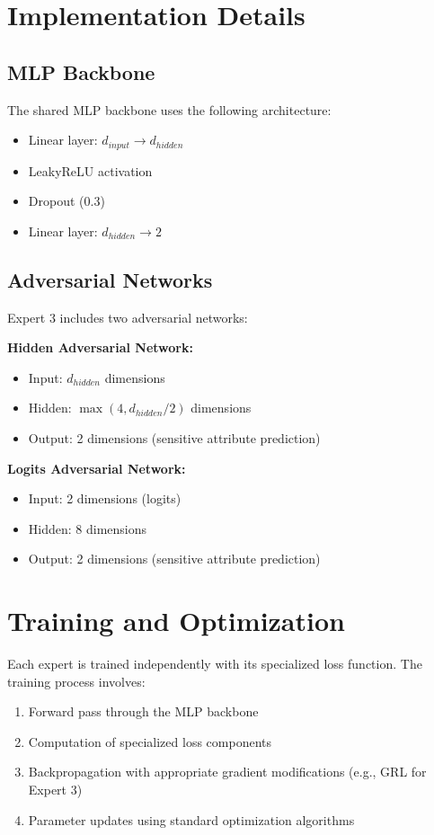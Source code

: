 \documentclass[11pt]{article}
\begin{document}
\section{Implementation Details}

\subsection{MLP Backbone}
The shared MLP backbone uses the following architecture:
\begin{itemize}
    \item Linear layer: $d_{input} \rightarrow d_{hidden}$
    \item LeakyReLU activation
    \item Dropout (0.3)
    \item Linear layer: $d_{hidden} \rightarrow 2$
\end{itemize}

\subsection{Adversarial Networks}
Expert 3 includes two adversarial networks:

\textbf{Hidden Adversarial Network:}
\begin{itemize}
    \item Input: $d_{hidden}$ dimensions
    \item Hidden: $\max(4, d_{hidden}/2)$ dimensions
    \item Output: 2 dimensions (sensitive attribute prediction)
\end{itemize}

\textbf{Logits Adversarial Network:}
\begin{itemize}
    \item Input: 2 dimensions (logits)
    \item Hidden: 8 dimensions
    \item Output: 2 dimensions (sensitive attribute prediction)
\end{itemize}

\section{Training and Optimization}

Each expert is trained independently with its specialized loss function. The training process involves:

\begin{enumerate}
    \item Forward pass through the MLP backbone
    \item Computation of specialized loss components
    \item Backpropagation with appropriate gradient modifications (e.g., GRL for Expert 3)
    \item Parameter updates using standard optimization algorithms
\end{enumerate}
\end{document}
